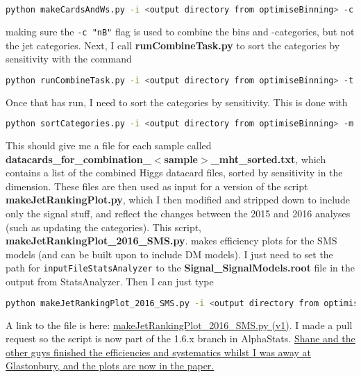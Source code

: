 \begin{lstlisting}[belowskip=-0.7cm, language=sh, numbers=none]
python makeCardsAndWs.py -i <output directory from optimiseBinning> -c "nB"
\end{lstlisting}

making sure the \texttt{-c "nB"} flag is used to combine the \HT bins and \Pqb-categories, but not the jet categories. Next, I call \textbf{runCombineTask.py} to sort the categories by sensitivity with the command

\begin{lstlisting}[belowskip=-0.7cm, language=sh, numbers=none]
python runCombineTask.py -i <output directory from optimiseBinning> -t ASCLS_UL_PRIOR --what expected
\end{lstlisting}

Once that has run, I need to sort the \njet categories by sensitivity. This is done with

\begin{lstlisting}[belowskip=-0.7cm, language=sh, numbers=none]
python sortCategories.py -i <output directory from optimiseBinning> -m ul -c "nB"
\end{lstlisting}

This should give me a file for each sample called \textbf{datacards\_for\_combination\_$<$sample$>$\_mht\_sorted.txt}, which contains a list of the combined Higgs datacard files, sorted by sensitivity in the \njet dimension. These files are then used as input for a version of the script \textbf{makeJetRankingPlot.py}, which I then modified and stripped down to include only the signal stuff, and reflect the changes between the 2015 and 2016 analyses (such as updating the \njet categories). This script, \textbf{makeJetRankingPlot\_2016\_SMS.py}. makes efficiency plots for the SMS models (and can be built upon to include DM models). I just need to set the path for \texttt{inputFileStatsAnalyzer} to the \textbf{Signal\_SignalModels.root} file in the output from StatsAnalyzer. Then I can just type

\begin{lstlisting}[belowskip=-0.7cm, language=sh, numbers=none]
python makeJetRankingPlot_2016_SMS.py -i <output directory from optimiseBinning> -o <output directory for efficiency plots>
\end{lstlisting}

A link to the file is here: \href{run:modules/Sec 23 - Signal model analyses for SUS-16-038listings//makeJetRankingPlot_2016_SMSv1.py}{makeJetRankingPlot\_2016\_SMS.py (v1)}. I made a pull request so the script is now part of the 1.6.x branch in AlphaStats. \uline{Shane and the other guys finished the efficiencies and systematics whilst I was away at Glastonbury, and the plots are now in the paper.}


